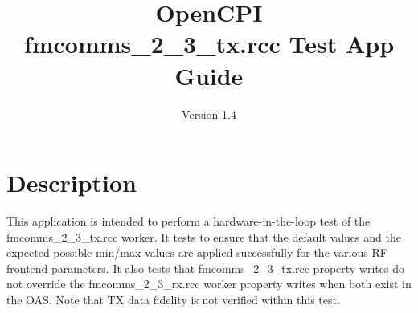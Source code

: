 \iffalse
This file is protected by Copyright. Please refer to the COPYRIGHT file
distributed with this source distribution.

This file is part of OpenCPI <http://www.opencpi.org>

OpenCPI is free software: you can redistribute it and/or modify it under the
terms of the GNU Lesser General Public License as published by the Free Software
Foundation, either version 3 of the License, or (at your option) any later
version.

OpenCPI is distributed in the hope that it will be useful, but WITHOUT ANY
WARRANTY; without even the implied warranty of MERCHANTABILITY or FITNESS FOR A
PARTICULAR PURPOSE. See the GNU Lesser General Public License for more details.

You should have received a copy of the GNU Lesser General Public License along
with this program. If not, see <http://www.gnu.org/licenses/>.
\fi

\def\docTitle{OpenCPI\\ fmcomms\_2\_3\_tx.rcc Test App Guide}
\def\docVersion{1.4}

\date{Version \docVersion} %
\title{\docTitle}
\usepackage{graphicx}
\graphicspath{ {figures/} }
\usepackage{textcomp}
\usepackage{listings}


\maketitle

\section{Description}
This application is intended to perform a hardware-in-the-loop test of the fmcomms\_2\_3\_tx.rcc worker. It tests to ensure that the default values and the expected possible min/max values are applied successfully for the various RF frontend parameters. It also tests that fmcomms\_2\_3\_tx.rcc property writes do not override the fmcomms\_2\_3\_rx.rcc worker property writes when both exist in the OAS. Note that TX data fidelity is not verified within this test.

